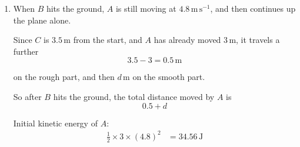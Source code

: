 \documentclass[leqno]{article}
\begin{document}
\begin{enumerate}[
  label=\textbf{\arabic*.},
  leftmargin=*,
  topsep=0pt,
  partopsep=0pt,
  parsep=0pt
]
\begin{djsSolution}
\begin{enumerate}[label=\textbf{(\alph*)}]
  Since \(A\) moves \(3\,\mathrm{m}\) along the rough plane, the work done against friction is
  \[
  \mu\times \frac{36g}{13}\times 3=\frac{108g\mu}{13}
  \]

  Take the ground as the zero level for the gravitational potential energy of \(B\), and the initial position of \(A\) as that for \(A\). The work--energy principle is
  \[
  KE_0+GPE_0+\sum W_{\text{other}}=KE_1+GPE_1
  \]

  with state 0 at release and state 1 when \(B\) hits the ground. Here, with the heights from part (a):
  \[
  KE_0=0,\qquad KE_1=92.16,\qquad GPE_0=15g,\qquad GPE_1=\frac{45g}{13}
  \]

  The only other force doing work is friction, so \(\sum W_{\text{other}}=-\frac{108g\mu}{13}\).

  So
  \[
  0+15g-\frac{108g\mu}{13}=92.16+\frac{45g}{13}
  \]

  Since \(15g-\frac{45g}{13}=\frac{150g}{13}\), as in part (a), this gives
  \[
  \frac{150g}{13}=92.16+\frac{108g\mu}{13}
  \]

  Substituting \(g=9.8=\frac{49}{5}\):
  \[
  \frac{1470}{13}=\frac{2304}{25}+\frac{5292\mu}{65}
  \]

  So
  \begin{align*}
  \frac{5292\mu}{65}
  &=\frac{1470}{13}-\frac{2304}{25}\\
  &=\frac{36\,750-29\,952}{325}\\
  &=\frac{6798}{325}
  \end{align*}

  Therefore
  \begin{align*}
  \mu
  &=\frac{6798}{325}\times \frac{65}{5292}\\
  &=\frac{1133}{4410}\\
  &\approx 0.257
  \end{align*}

  \item When \(B\) hits the ground, \(A\) is still moving at \(4.8\,\mathrm{m\,s^{-1}}\), and then continues up the plane alone.

  Since \(C\) is \(3.5\,\mathrm{m}\) from the start, and \(A\) has already moved \(3\,\mathrm{m}\), it travels a further
  \[
  3.5-3=0.5\,\mathrm{m}
  \]

  on the rough part, and then \(d\,\mathrm{m}\) on the smooth part.

  So after \(B\) hits the ground, the total distance moved by \(A\) is
  \[
  0.5+d
  \]

  Initial kinetic energy of \(A\):
  \begin{align*}
  \frac12\times 3\times (4.8)^2
  &=34.56\,\mathrm{J}
  \end{align*}


\end{enumerate}
\end{djsSolution}
\end{enumerate}
\end{document}
